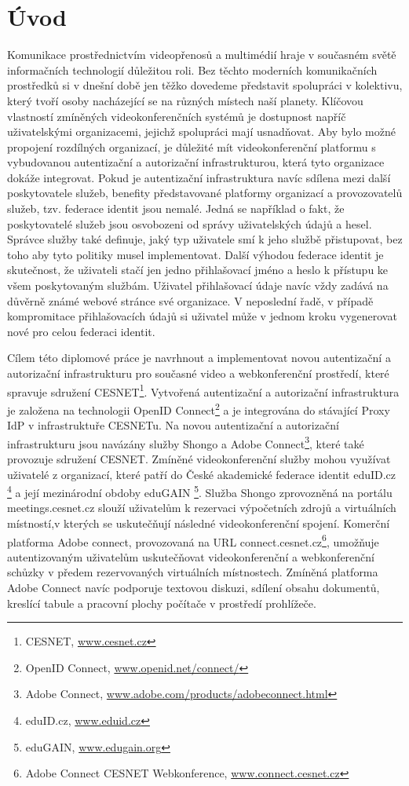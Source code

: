 \documentclass[
  printed, %
  twoside, %
  table,   %
  nolof,     %
  nolot,     %
]{fithesis3}
\begin{document}
\chapter{Úvod}
Komunikace prostřednictvím videopřenosů a multimédií hraje v současném světě informačních technologií důležitou roli. Bez těchto moderních komunikačních prostředků si v dnešní době jen těžko dovedeme představit spolupráci v kolektivu, který tvoří osoby nacházející se na různých místech naší planety. Klíčovou vlastností zmíněných videokonferenčních systémů je dostupnost napříč uživatelskými organizacemi, jejichž spolupráci mají usnadňovat. Aby bylo možné propojení rozdílných organizací, je důležité mít videokonferenční platformu s vybudovanou autentizační a autorizační infrastrukturou, která tyto organizace dokáže integrovat. Pokud je autentizační infrastruktura navíc sdílena mezi další poskytovatele služeb, benefity představované platformy organizací a provozovatelů služeb, tzv. federace identit jsou nemalé. Jedná se například o fakt, že poskytovatelé služeb jsou osvobozeni od správy uživatelských údajů a hesel. Správce služby také definuje, jaký typ uživatele smí k jeho službě přistupovat, bez toho aby tyto politiky musel implementovat. Další výhodou federace identit je skutečnost, že uživateli stačí jen jedno přihlašovací jméno a heslo k přístupu ke všem poskytovaným službám. Uživatel přihlašovací údaje navíc vždy zadává na důvěrně známé webové stránce své organizace. V neposlední řadě, v případě kompromitace  přihlašovacích údajů si uživatel může v jednom kroku vygenerovat nové pro celou federaci identit. 

Cílem této diplomové práce je navrhnout a implementovat novou autentizační a autorizační infrastrukturu pro současné video a webkonferenční prostředí, které spravuje sdružení CESNET\footnote{CESNET, \url{www.cesnet.cz}}. Vytvořená autentizační a autorizační infrastruktura je založena na technologii OpenID Connect\footnote{OpenID Connect, \url{www.openid.net/connect/}}  a je integrována do stávající Proxy IdP v infrastruktuře CESNETu. Na novou autentizační a autorizační infrastrukturu jsou navázány služby Shongo \cite{shongoapi} a Adobe Connect\footnote{Adobe Connect, \url{www.adobe.com/products/adobeconnect.html}}, které také provozuje sdružení CESNET. Zmíněné videokonferenční služby mohou využívat uživatelé z organizací, které patří do České akademické federace identit eduID.cz \footnote{eduID.cz, \url{www.eduid.cz}} a její mezinárodní obdoby eduGAIN \footnote{eduGAIN, \url{www.edugain.org}}. Služba Shongo zprovozněná na portálu meetings.cesnet.cz slouží uživatelům k rezervaci výpočetních zdrojů a virtuálních místností,v kterých se uskutečňují následné videokonferenční spojení. Komerční platforma Adobe connect, provozovaná na URL connect.cesnet.cz\footnote{Adobe Connect CESNET Webkonference, \url{www.connect.cesnet.cz}}, umožňuje autentizovaným uživatelům uskutečňovat videokonferenční a webkonferenční schůzky v předem rezervovaných virtuálních místnostech. Zmíněná platforma Adobe Connect navíc podporuje textovou diskuzi, sdílení obsahu dokumentů, kreslící tabule a pracovní plochy počítače v prostředí prohlížeče. 
\end{document}
